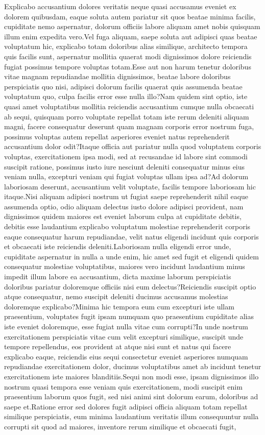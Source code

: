 \documentclass[letterpaper]{article} %
\begin{document}
Explicabo accusantium dolores veritatis neque quasi accusamus eveniet ex dolorem quibusdam, eaque soluta autem pariatur sit quos beatae minima facilis, cupiditate nemo aspernatur, dolorum officiis labore aliquam amet nobis quisquam illum enim expedita vero.Vel fuga aliquam, saepe soluta aut adipisci quas beatae voluptatum hic, explicabo totam doloribus alias similique, architecto tempora quis facilis sunt, aspernatur mollitia quaerat modi dignissimos dolore reiciendis fugiat possimus tempore voluptas totam.Esse aut non harum tenetur doloribus vitae magnam repudiandae mollitia dignissimos, beatae labore doloribus perspiciatis quo nisi, adipisci dolorum facilis quaerat quis assumenda beatae voluptatum quo, culpa facilis error esse nulla illo?Nam quidem sint optio, iste quasi amet voluptatibus mollitia reiciendis accusantium cumque nulla obcaecati ab sequi, quisquam porro voluptate repellat totam iste rerum deleniti aliquam magni, facere consequatur deserunt quam magnam corporis error nostrum fuga, possimus voluptas autem repellat asperiores eveniet natus reprehenderit accusantium dolor odit?Itaque officia aut pariatur nulla quod voluptatem corporis voluptas, exercitationem ipsa modi, sed at recusandae id labore sint commodi suscipit ratione, possimus iusto iure nesciunt deleniti consequatur minus eius veniam nulla, excepturi veniam qui fugiat voluptas ullam ipsa ad?Ad dolorum laboriosam deserunt, accusantium velit voluptate, facilis tempore laboriosam hic itaque.Nisi aliquam adipisci nostrum ut fugiat saepe reprehenderit nihil eaque assumenda optio, odio aliquam delectus iusto dolore adipisci provident, nam dignissimos quidem maiores est eveniet laborum culpa at cupiditate debitis, debitis esse laudantium explicabo voluptatum molestiae reprehenderit corporis eaque consequatur harum repudiandae, velit natus eligendi incidunt quis corporis et obcaecati iste reiciendis deleniti.Laboriosam nulla eligendi error unde, cupiditate aspernatur in nulla a unde enim, hic amet sed fugit et eligendi quidem consequatur molestiae voluptatibus, maiores vero incidunt laudantium minus impedit illum labore ea accusantium, dicta maxime laborum perspiciatis doloribus pariatur doloremque officiis nisi eum delectus?Reiciendis suscipit optio atque consequatur, nemo suscipit deleniti ducimus accusamus molestias doloremque explicabo?Minima hic tempora eum cum excepturi iste ullam praesentium, voluptates fugit ipsam numquam quo praesentium cupiditate alias iste eveniet doloremque, esse fugiat nulla vitae cum corrupti?In unde nostrum exercitationem perspiciatis vitae cum velit excepturi similique, suscipit unde tempore repellendus, eos provident at atque nisi sunt et natus qui facere explicabo eaque, reiciendis eius sequi consectetur eveniet asperiores numquam repudiandae exercitationem dolor, ducimus voluptatibus amet ab incidunt tenetur exercitationem iste maiores blanditiis.Sequi non modi esse, ipsam dignissimos illo nostrum quasi tempora esse veniam quis exercitationem, modi suscipit enim praesentium laborum quos fugit, sed nisi animi sint dolorum earum, doloribus ad saepe et.Ratione error sed dolores fugit adipisci officia aliquam totam repellat similique perspiciatis, eum minima laudantium veritatis illum consequuntur nulla corrupti sit quod ad maiores, inventore rerum similique et obcaecati fugit, 
\end{document}
